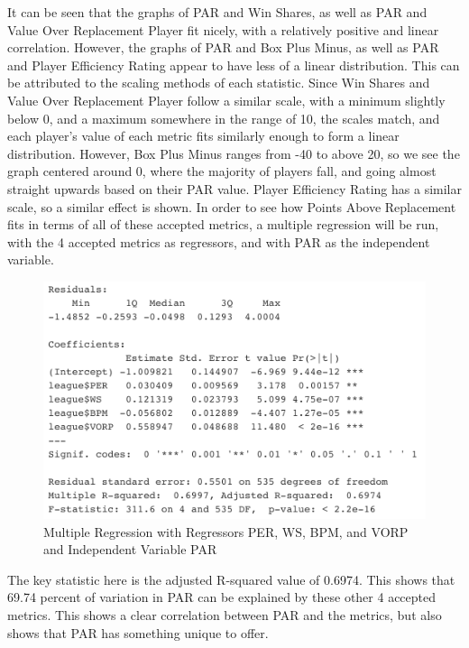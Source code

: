 \documentclass[12pt, titlepage]{article}
\begin{document}
It can be seen that the graphs of PAR and Win Shares, as well as PAR and Value Over Replacement Player 
fit nicely, with a relatively positive and linear correlation. However, the graphs of PAR and Box Plus Minus, 
as well as PAR and Player Efficiency Rating appear to have less of a linear distribution. This can be 
attributed to the scaling methods of each statistic. Since Win Shares and Value Over Replacement Player 
follow a similar scale, with a minimum slightly below 0, and a maximum somewhere in the range of 10, the 
scales match, and each player's value of each metric fits similarly enough to form a linear distribution. 
However, Box Plus Minus ranges from -40 to above 20, so we see the graph centered around 0, where the 
majority of players fall, and going almost straight upwards based on their PAR value. Player Efficiency 
Rating has a similar scale, so a similar effect is shown. In order to see how Points Above Replacement fits 
in terms of all of these accepted metrics, a multiple regression will be run, with the 4 accepted metrics as 
regressors, and with PAR as the independent variable.
\begin{figure}[H]
  \centering
  \includegraphics[scale = 0.6]{MultipleRegression}
  \caption{Multiple Regression with Regressors PER, WS, BPM, and VORP and Independent Variable PAR}
  \label{fig:Fig5}
\end{figure}

The key statistic here is the adjusted R-squared value of 0.6974. This shows that 69.74 percent of variation 
in PAR can be explained by these other 4 accepted metrics. This shows a clear correlation between PAR 
and the metrics, but also shows that PAR has something unique to offer.
\end{document}

